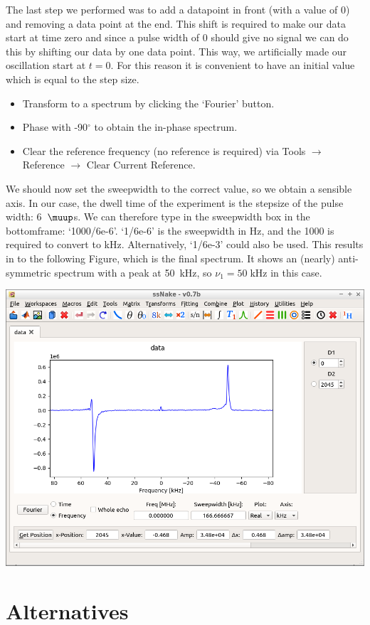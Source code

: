\documentclass[11pt,a4paper]{article}
\begin{document}
The last step we performed was to add a datapoint in front (with a value of 0) and removing a data point at the end.
This shift is required to make our data start at time zero and since a pulse width of 0 should give no signal we can do this by shifting our data by one data point.
This way, we artificially made our oscillation start at $t=0$.
For this reason it is convenient to have an initial value which is equal to the step size.


\begin{itemize}
  \item Transform to a spectrum by clicking the `Fourier' button.
\item Phase with -90$^\circ$ to obtain the in-phase spectrum.
\item Clear the reference frequency (no reference is required) via Tools $\longrightarrow$ Reference $\longrightarrow$ Clear Current Reference.
\end{itemize}
We should now set the sweepwidth to the correct value, so we obtain a sensible axis.
In our case, the dwell time of the experiment is the stepsize of the pulse width: 6~$\muup$s.
We can therefore type in the sweepwidth box in the bottomframe: `1000/6e-6'.
`1/6e-6' is the sweepwidth in Hz, and the 1000 is required to convert to kHz.
Alternatively, `1/6e-3' could also be used.
This results in to the following Figure, which is the final spectrum.
It shows an (nearly) anti-symmetric spectrum with a peak at 50~kHz, so $\nu_1 = 50\;$kHz in this case.
\begin{center}
\includegraphics[width=0.8\linewidth]{Figs/Fig4.png}
\end{center}

\section{Alternatives}
\end{document}
